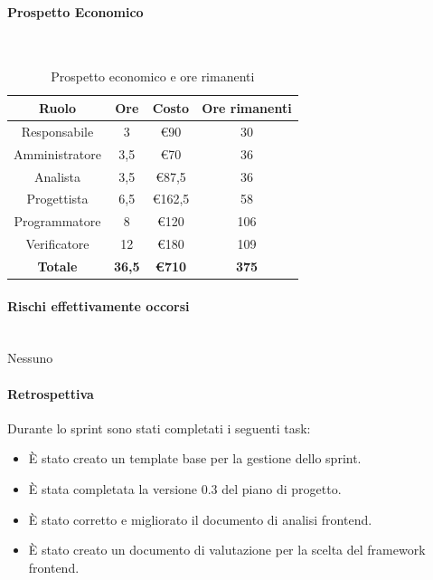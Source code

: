 \documentclass{article}
\begin{document}
                \paragraph{Prospetto Economico}\mbox{}\\
                \begin{table}[H]
                    \centering
                    \begin{tabular}{|c|c|c|c|}
                    \hline
                    \textbf{Ruolo}  & \textbf{Ore}  & \textbf{Costo} & \textbf{Ore rimanenti} \\ \hline
                    Responsabile    & 3             & €90            & 30                     \\ \hline
                    Amministratore  & 3,5           & €70            & 36                   \\ \hline
                    Analista        & 3,5           & €87,5          & 36                   \\ \hline
                    Progettista     & 6,5           & €162,5         & 58                   \\ \hline
                    Programmatore   & 8            & €120           & 106                    \\ \hline
                    Verificatore    & 12            & €180           & 109                    \\ \hline
                    \textbf{Totale} & \textbf{36,5} & \textbf{\euro710}   & \textbf{375}         \\ \hline
                    \end{tabular}
                    \caption{Prospetto economico e ore rimanenti}
                \end{table}


                \paragraph{Rischi effettivamente occorsi}\mbox{}\\
                Nessuno

                \paragraph{Retrospettiva}
                Durante lo sprint sono stati completati i seguenti task:
                \begin{itemize}
                    \item È stato creato un template base per la gestione dello sprint.
                    \item È stata completata la versione 0.3 del piano di progetto.
                    \item È stato corretto e migliorato il documento di analisi frontend.
                    \item È stato creato un documento di valutazione per la scelta del framework frontend.
                \end{itemize}
                
\end{document}
